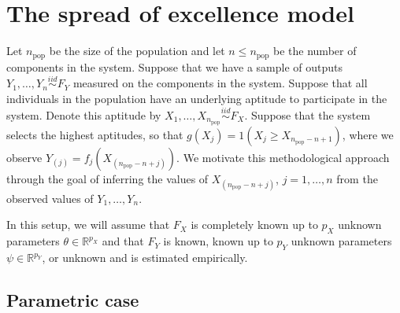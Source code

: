 \documentclass[11pt]{article}
\newcommand{\R}{\mathbb{R}}
\newcommand{\npop}{n_{\text{pop}}}
\newcommand{\nsys}{n}
\begin{document}
\section{The spread of excellence model}

Let $\npop$ be the size of the population and let $\nsys \leq \npop$ be the number of components in the system. Suppose that we have a sample of outputs $Y_1,\ldots,Y_{\nsys} \overset{iid}{\sim} F_Y$ measured on the components in the system. Suppose that all individuals in the population have an underlying aptitude to participate in the system. Denote this aptitude by $X_1,\ldots,X_{\npop} \overset{iid}{\sim} F_X$. Suppose that the system selects the highest aptitudes, so that $g(X_j) = 1(X_j \geq X_{\npop - \nsys + 1})$, where we observe $Y_{(j)} = f_j(X_{(\npop - \nsys + j)})$. We motivate this methodological approach through the goal of inferring the values of $X_{(\npop - \nsys + j)}$, $j = 1,\ldots,\nsys$ from the observed values of $Y_1,\ldots,Y_{\nsys}$. 

In this setup, we will assume that $F_X$ is completely known up to $p_X$ unknown parameters $\theta \in \R^{p_X}$ and that $F_Y$ is known, known up to $p_Y$ unknown parameters $\psi \in \R^{p_Y}$, or unknown and is estimated empirically. 

\subsection{Parametric case}
\end{document}
